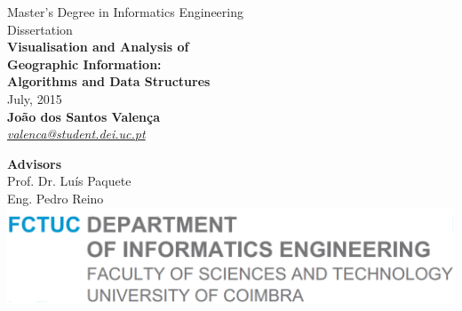 \pagestyle{empty}
\sffamily

\vspace{0.5cm}
\LARGE{Master's Degree in Informatics Engineering}\\[1pc]
\Large{Dissertation}\\[2pc]

\vspace{4cm}
\doublespacing\Huge{\textbf{%
		Visualisation and Analysis of \\Geographic Information:\\ Algorithms and Data Structures}}\\[1pc]
\Large{July, 2015}\\[3pc]


\singlespacing
\LARGE{\textbf{João dos Santos Valença}}\\[0.25pc]
\large{\href{mailto:valenca@student.dei.uc.pt}{\textit{valenca@student.dei.uc.pt}}}\\

\vspace{1.5cm}

\Large{\textbf{Advisors}}\\[0.5pc]
\large{Prof. Dr. Luís Paquete}\\
\large{Eng. Pedro Reino}\\

\vfill
\noindent\includegraphics[scale=0.25]{Figures/dei}

\rmfamily
\normalsize
